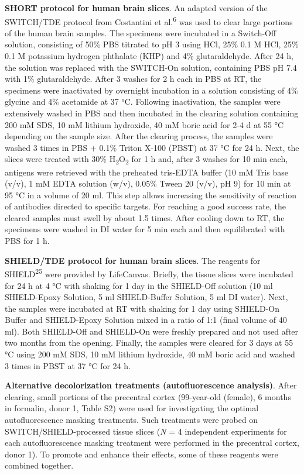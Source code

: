 \documentclass{article}
\begin{document}
\textbf{SHORT protocol for human brain slices}. An adapted version of the SWITCH/TDE protocol from Costantini et al.\textsuperscript{6} was used to clear large portions of the human brain samples. The specimens were incubated in a Switch-Off solution, consisting of 50\% PBS titrated to pH 3 using HCl, 25\% 0.1 M HCl, 25\% 0.1 M potassium hydrogen phthalate (KHP) and 4\% glutaraldehyde. After 24 h, the solution was replaced with the SWITCH-On solution, containing PBS pH 7.4 with 1\% glutaraldehyde. After 3 washes for 2 h each in PBS at RT, the specimens were inactivated by overnight incubation in a solution consisting of 4\% glycine and 4\% acetamide at 37 °C. Following inactivation, the samples were extensively washed in PBS and then incubated in the clearing solution containing 200 mM SDS, 10 mM lithium hydroxide, 40 mM boric acid for 2-4 d at 55 °C depending on the sample size. After the clearing process, the samples were washed 3 times in PBS + 0.1\% Triton X-100 (PBST) at 37 °C for 24 h. Next, the slices were treated with 30\% H\textsubscript{2}O\textsubscript{2} for 1 h and, after 3 washes for 10 min each, antigens were retrieved with the preheated tris-EDTA buffer (10 mM Tris base (v/v), 1 mM EDTA solution (w/v), 0.05\% Tween 20 (v/v), pH 9) for 10 min at 95 °C in a volume of 20 ml. This step allows increasing the sensitivity of reaction of antibodies directed to specific targets. For reaching a good success rate, the cleared samples must swell by about 1.5 times. After cooling down to RT, the specimens were washed in DI water for 5 min each and then equilibrated with PBS for 1 h.

\textbf{SHIELD/TDE protocol for human brain slices}. The reagents for SHIELD\textsuperscript{25} were provided by LifeCanvas. Briefly, the tissue slices were incubated for 24 h at 4 °C with shaking for 1 day in the SHIELD-Off solution (10 ml SHIELD-Epoxy Solution, 5 ml SHIELD-Buffer Solution, 5 ml DI water). Next, the samples were incubated at RT with shaking for 1 day using SHIELD-On Buffer and SHIELD-Epoxy Solution mixed in a ratio of 1:1 (final volume of 40 ml). Both SHIELD-Off and SHIELD-On were freshly prepared and not used after two months from the opening. Finally, the samples were cleared for 3 days at 55 °C using 200 mM SDS, 10 mM lithium hydroxide, 40 mM boric acid and washed 3 times in PBST at 37 °C for 24 h.

\textbf{Alternative decolorization treatments (autofluorescence analysis)}. After clearing, small portions of the precentral cortex (99-year-old (female), 6 months in formalin, donor 1, Table S2) were used for investigating the optimal autofluorescence masking treatments. Such treatments were probed on SWITCH/SHIELD-processed tissue slices (\emph{N} = 4 independent experiments for each autofluorescence masking treatment were performed in the precentral cortex, donor 1). To promote and enhance their effects, some of these reagents were combined together.
\end{document}
